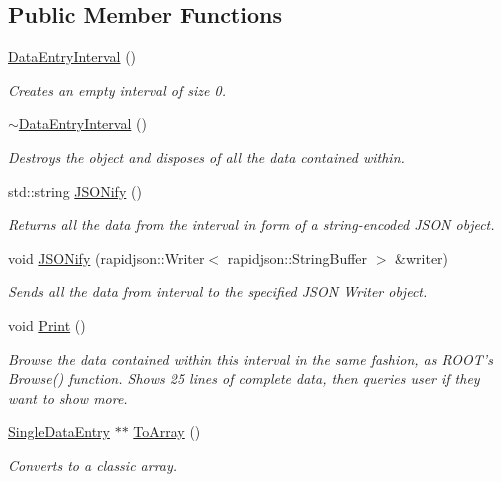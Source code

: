 \subsection*{Public Member Functions}
\begin{DoxyCompactItemize}
\item 
\hyperlink{classDataEntryInterval_ac3313356193f881b1bbf2e072523db82}{Data\+Entry\+Interval} ()
\begin{DoxyCompactList}\small\item\em Creates an empty interval of size 0. \end{DoxyCompactList}\item 
\hyperlink{classDataEntryInterval_a4b446c378e1ad0a5f63b5d131090f384}{$\sim$\+Data\+Entry\+Interval} ()
\begin{DoxyCompactList}\small\item\em Destroys the object and disposes of all the data contained within. \end{DoxyCompactList}\item 
std\+::string \hyperlink{classDataEntryInterval_ad27bffbb603c300714090c809ee58570}{J\+S\+O\+Nify} ()
\begin{DoxyCompactList}\small\item\em Returns all the data from the interval in form of a string-\/encoded J\+S\+O\+N object. \end{DoxyCompactList}\item 
void \hyperlink{classDataEntryInterval_aba5c55640085036f23b3a1afb2db3a15}{J\+S\+O\+Nify} (rapidjson\+::\+Writer$<$ rapidjson\+::\+String\+Buffer $>$ \&writer)
\begin{DoxyCompactList}\small\item\em Sends all the data from interval to the specified J\+S\+O\+N Writer object. \end{DoxyCompactList}\item 
void \hyperlink{classDataEntryInterval_a869d48a5a8f4562f3f2a5226451f65a2}{Print} ()
\begin{DoxyCompactList}\small\item\em Browse the data contained within this interval in the same fashion, as R\+O\+O\+T's Browse() function. Shows 25 lines of complete data, then queries user if they want to show more. \end{DoxyCompactList}\item 
\hyperlink{classSingleDataEntry}{Single\+Data\+Entry} $\ast$$\ast$ \hyperlink{classDataEntryInterval_a74c1d8cbede885e46afcce933f3adc70}{To\+Array} ()
\begin{DoxyCompactList}\small\item\em Converts to a classic array. \end{DoxyCompactList}\item 
$$
\end{DoxyCompactItemize}
